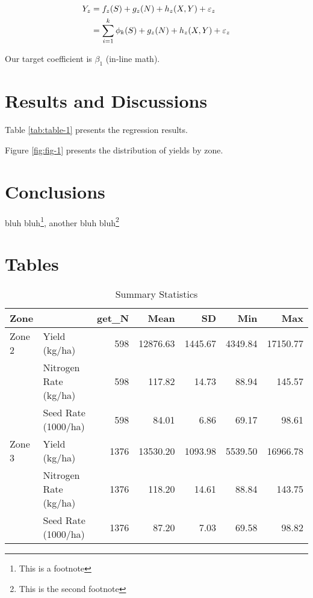 \documentclass[
  12pt,
]{article}
\begin{document}
\begin{align}
Y_z & = f_z(S) + g_z(N) + h_z(X,Y) + \varepsilon_z\notag \\
& = \sum_{i=1}^k \phi_k(S) + g_z(N) + h_z(X,Y) + \varepsilon_z \label{eq:eqn2}
\end{align}

Our target coefficient is \(\beta_1\) (in-line math).

\hypertarget{results-and-discussions}{%
\section{Results and Discussions}\label{results-and-discussions}}

Table \ref{tab:table-1} presents the regression results.

Figure \ref{fig:fig-1} presents the distribution of yields by zone.

\hypertarget{conclusions}{%
\section{Conclusions}\label{conclusions}}

bluh bluh\footnote{This is a footnote}, another bluh bluh\footnote{This is the second footnote}

\newpage

\hypertarget{tables}{%
\section{Tables}\label{tables}}

\begin{table}[!h]

\caption{\label{tab:sum-stat}Summary Statistics}
\centering
\begin{tabular}[t]{llrrrrr}
\toprule
Zone &   & get\_N & Mean & SD & Min & Max\\
\midrule
Zone 2 & Yield (kg/ha) & 598 & \num{12876.63} & \num{1445.67} & \num{4349.84} & \num{17150.77}\\
 & Nitrogen Rate (kg/ha) & 598 & \num{117.82} & \num{14.73} & \num{88.94} & \num{145.57}\\
 & Seed Rate (1000/ha) & 598 & \num{84.01} & \num{6.86} & \num{69.17} & \num{98.61}\\
Zone 3 & Yield (kg/ha) & 1376 & \num{13530.20} & \num{1093.98} & \num{5539.50} & \num{16966.78}\\
 & Nitrogen Rate (kg/ha) & 1376 & \num{118.20} & \num{14.61} & \num{88.84} & \num{143.75}\\
 & Seed Rate (1000/ha) & 1376 & \num{87.20} & \num{7.03} & \num{69.58} & \num{98.82}\\
\bottomrule
\end{tabular}
\end{table}
\end{document}
